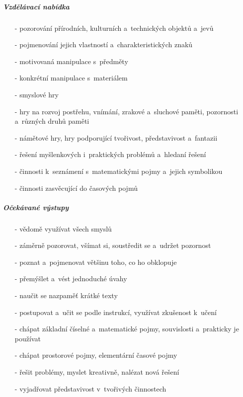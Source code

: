 					\subparagraph{Vzdělávací nabídka}

					\begin{itemize}
					\setlength\itemsep{-2mm}
						\item[-]pozorování přírodních, kulturních a~technických objektů a~jevů
						\item[-]pojmenování jejich vlastností a~charakteristických znaků
						\item[-]motivovaná manipulace s~předměty
						\item[-]konkrétní manipulace s~materiálem
						\item[-]smyslové hry
						\item[-]hry na rozvoj postřehu, vnímání, zrakové a~sluchové paměti, pozornosti a~různých druhů paměti
						\item[-]námětové hry, hry podporující tvořivost, představivost a~fantazii
						\item[-]řešení myšlenkových i~praktických problémů a~hledaní řešení
						\item[-]činnosti k~seznámení s~matematickými pojmy a~jejich symbolikou
						\item[-]činnosti zasvěcující do časových pojmů
					\end{itemize}

					\subparagraph{Očekávané výstupy}

					\begin{itemize}
					\setlength\itemsep{-2mm}
						\item[-]vědomě využívat všech smyslů
						\item[-]záměrně pozorovat, všímat si, soustředit se a~udržet pozornost
						\item[-]poznat a~pojmenovat většinu toho, co ho obklopuje
						\item[-]přemýšlet a~vést jednoduché úvahy
						\item[-]naučit se nazpaměť krátké texty
						\item[-]postupovat a~učit se podle instrukcí, využívat zkušenost k~učení
						\item[-]chápat základní číselné a~matematické pojmy, souvislosti a~prakticky je používat
						\item[-]chápat prostorové pojmy, elementární časové pojmy
						\item[-]řešit problémy, myslet kreativně, nalézat nová řešení
						\item[-]vyjadřovat představivost v~tvořivých činnostech
					\end{itemize}
									
